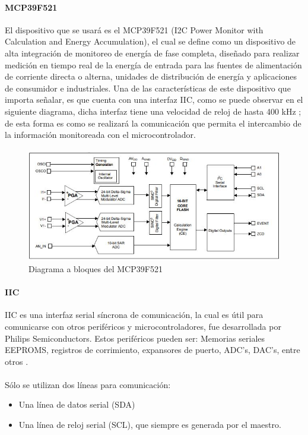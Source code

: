 \paragraph{MCP39F521}
El dispositivo que se usará es el MCP39F521 (I2C Power Monitor with Calculation and Energy Accumulation), el cual se define como un dispositivo de alta integración de monitoreo de energía de fase completa, diseñado para realizar medición en tiempo real de la energía de entrada para las fuentes de alimentación de corriente directa o alterna, unidades de distribución de energía y aplicaciones de consumidor e industriales. Una de las características de este dispositivo que importa señalar, es que cuenta con una interfaz IIC, como se puede observar en el siguiente diagrama, dicha interfaz tiene una velocidad de reloj de hasta 400 kHz \citep{MarcoTeorico13}; de esta forma es como se realizará la comunicación que permita el intercambio de la información monitoreada con el microcontrolador. 
\paragraph{}
\begin{figure}[H]
	\centering
	\includegraphics[scale=.9]{Capitulo2/images/DiagramaDispMonitoreo.JPG}
	\caption{Diagrama a bloques del MCP39F521}
	\label{fig:diagrama_dispMonitoreo}
\end{figure}

\paragraph{IIC}
IIC es una interfaz serial síncrona de comunicación, la cual es útil para comunicarse  con otros periféricos y microcontroladores, fue desarrollada por Philips Semiconductors.
Estos periféricos pueden ser: Memorias seriales EEPROMS, registros de corrimiento, expansores de puerto, ADC's, DAC's, entre otros \citep{MarcoTeorico17}.
\paragraph{}
Sólo se utilizan dos líneas para comunicación:
\begin{itemize}
	\item Una línea de datos serial (SDA)
    \item Una línea de reloj serial (SCL), que siempre es generada por el maestro.
\end{itemize}

